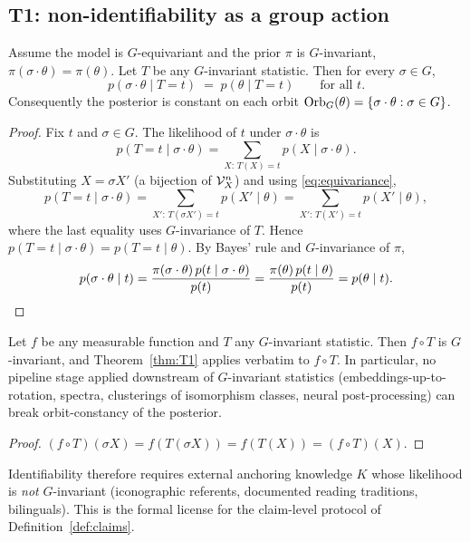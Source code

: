 \subsection{T1: non-identifiability as a group action}

\begin{theorem}
\label{thm:T1}
Assume the model is $G$-equivariant and the prior $\pi$ is
$G$-invariant, $\pi(\sigma\cdot\theta)=\pi(\theta)$. Let $T$ be any
$G$-invariant statistic. Then for every $\sigma\in G$,
\[
p(\sigma\cdot\theta\mid T=t)\;=\;p(\theta\mid T=t)
\qquad\text{for all }t .
\]
Consequently the posterior is constant on each orbit
$\mathrm{Orb}_G(\theta)=\{\sigma\cdot\theta:\sigma\in G\}$.
\end{theorem}

\begin{proof}
Fix $t$ and $\sigma\in G$. The likelihood of $t$ under
$\sigma\cdot\theta$ is
\[
p(T=t\mid\sigma\cdot\theta)
=\sum_{X:\,T(X)=t} p(X\mid\sigma\cdot\theta).
\]
Substituting $X=\sigma X'$ (a bijection of $\mathcal{V}_X^{n}$) and using
\eqref{eq:equivariance},
\[
p(T=t\mid\sigma\cdot\theta)
=\sum_{X':\,T(\sigma X')=t} p(X'\mid\theta)
=\sum_{X':\,T(X')=t} p(X'\mid\theta),
\]
where the last equality uses $G$-invariance of $T$. Hence
$p(T=t\mid\sigma\cdot\theta)=p(T=t\mid\theta)$. By Bayes' rule and
$G$-invariance of $\pi$,
\[
p(\sigma\cdot\theta\mid t)
=\frac{\pi(\sigma\cdot\theta)\,p(t\mid\sigma\cdot\theta)}
       {p(t)}
=\frac{\pi(\theta)\,p(t\mid\theta)}{p(t)}
=p(\theta\mid t).\qedhere
\]
\end{proof}

\begin{corollary}
\label{cor:T1-dpi}
Let $f$ be any measurable function and $T$ any $G$-invariant
statistic. Then $f\circ T$ is $G$-invariant, and
Theorem~\ref{thm:T1} applies verbatim to $f\circ T$. In particular, no
pipeline stage applied downstream of $G$-invariant statistics
(embeddings-up-to-rotation, spectra, clusterings of isomorphism
classes, neural post-processing) can break orbit-constancy of the
posterior.
\end{corollary}

\begin{proof}
$(f\circ T)(\sigma X)=f(T(\sigma X))=f(T(X))=(f\circ T)(X)$.
\end{proof}

\begin{remark}
Identifiability therefore requires external anchoring knowledge $K$
whose likelihood is \emph{not} $G$-invariant (iconographic referents,
documented reading traditions, bilinguals). This is the formal license
for the claim-level protocol of Definition~\ref{def:claims}.
\end{remark}

